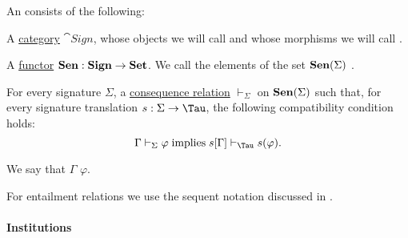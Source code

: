 \begin{definition}\label{def:entailment_system}
  An  consists of the following:
  \begin{thmenum}
     A \hyperref[def:category]{category} \( \cat{Sign} \), whose objects we will call  and whose morphisms we will call .

     A \hyperref[def:functor]{functor} \( \op*{Sen}: \cat{Sign} \to \cat{Set} \). We call the elements of the set \( \op*{Sen}(\Sigma) \) .

     For every signature \( \Sigma \), a \hyperref[def:consequence_relation]{consequence relation} \( \vdash_\Sigma \) on \( \op*{Sen}(\Sigma) \) such that, for every signature translation \( s: \Sigma \to \Tau \), the following compatibility condition holds:
    \begin{equation}\label{eq:def:entailment_system/entailment}
      \Gamma \vdash_\Sigma \varphi \T{implies} s[\Gamma] \vdash_\Tau s(\varphi).
    \end{equation}

    We say that \( \Gamma \)  \( \varphi \).
  \end{thmenum}
\end{definition}
\begin{comments}
  \item For entailment relations we use the sequent notation discussed in .
\end{comments}

\paragraph{Institutions}

